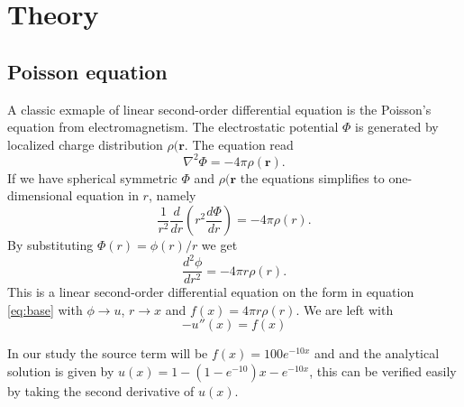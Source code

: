\documentclass[10pt, a4paper]{amsart}
\begin{document}
\section{Theory}
\subsection{Poisson equation}
A classic exmaple of linear second-order differential equation is the Poisson's equation from electromagnetism. The electrostatic potential $\Phi$ is generated by localized charge distribution $\rho(\mathbf{r}.$ The equation read 
\begin{equation}
	\nabla^2\Phi = -4\pi\rho(\mathbf{r})\nonumber.
\end{equation}
If we have spherical symmetric $\Phi$ and $\rho(\mathbf{r}$ the equations simplifies to one-dimensional equation in $r$, namely 
\begin{equation}
	\frac{1}{r^2}\frac{d}{dr}\left( r^2\frac{d\Phi}{dr}\right) = -4\pi\rho(r).	\nonumber
\end{equation}
By substituting $\Phi(r) = \phi(r)/r$ we get 
\begin{equation}
	\frac{d^2\phi}{dr^2} = -4\pi r\rho(r).\nonumber
\end{equation}
This is a linear second-order differential equation on the form in equation \ref{eq:base} with $\phi \rightarrow u$, $r \rightarrow x$ and $f(x) = 4\pi r\rho(r)$. We are left with
\begin{equation}
	-u''(x) = f(x)\nonumber
\end{equation}

In our study the source term will be $f(x) = 100e^{-10x}$ and and the analytical solution is given by $u(x) = 1-(1-e^{-10})x-e^{-10x}$, this can be verified easily by taking the second derivative of $u(x)$.
\end{document}
